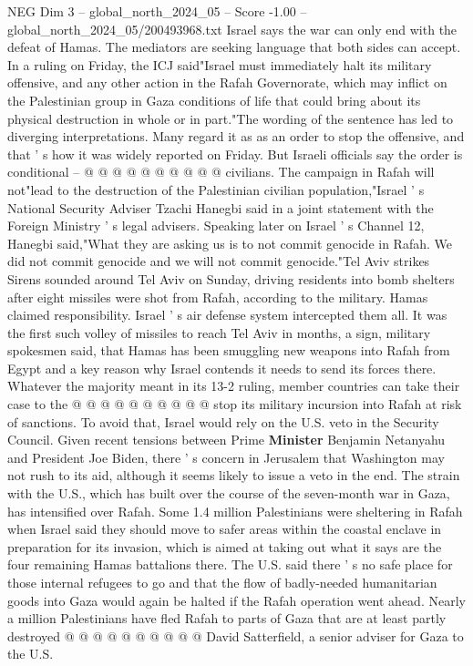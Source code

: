 \begin{textsample}{NEG Dim 3 – global\_north\_2024\_05 – Score -1.00 – global\_north\_2024\_05/200493968.txt}
Israel says the war can only end with the defeat of Hamas.
The mediators are seeking language that both sides can accept.
In a ruling on Friday, the ICJ said"Israel must immediately halt its military offensive, and any other action in the Rafah Governorate, which may inflict on the Palestinian group in Gaza conditions of life that could bring about its physical destruction in whole or in part."The wording of the sentence has led to diverging interpretations.
Many regard it as as an order to stop the offensive, and that ' s how it was widely reported on Friday.
But Israeli officials say the order is conditional -- @ @ @ @ @ @ @ @ @ @ civilians.
The campaign in Rafah will not"lead to the destruction of the Palestinian civilian population,"Israel ' s National Security Adviser Tzachi Hanegbi said in a joint statement with the Foreign Ministry ' s legal advisers.
Speaking later on Israel ' s Channel 12, Hanegbi said,"What they are asking us is to not commit genocide in Rafah.
We did not commit genocide and we will not commit genocide."Tel Aviv strikes Sirens sounded around Tel Aviv on Sunday, driving residents into bomb shelters after eight missiles were shot from Rafah, according to the military.
Hamas claimed responsibility.
Israel ' s air defense system intercepted them all.
It was the first such volley of missiles to reach Tel Aviv in months, a sign, military spokesmen said, that Hamas has been smuggling new weapons into Rafah from Egypt and a key reason why Israel contends it needs to send its forces there.
Whatever the majority meant in its 13-2 ruling, member countries can take their case to the @ @ @ @ @ @ @ @ @ @ stop its military incursion into Rafah at risk of sanctions.
To avoid that, Israel would rely on the U.S. veto in the Security Council.
Given recent tensions between Prime \textbf{Minister} Benjamin Netanyahu and President Joe Biden, there ' s concern in Jerusalem that Washington may not rush to its aid, although it seems likely to issue a veto in the end.
The strain with the U.S., which has built over the course of the seven-month war in Gaza, has intensified over Rafah.
Some 1.4 million Palestinians were sheltering in Rafah when Israel said they should move to safer areas within the coastal enclave in preparation for its invasion, which is aimed at taking out what it says are the four remaining Hamas battalions there.
The U.S. said there ' s no safe place for those internal refugees to go and that the flow of badly-needed humanitarian goods into Gaza would again be halted if the Rafah operation went ahead.
Nearly a million Palestinians have fled Rafah to parts of Gaza that are at least partly destroyed @ @ @ @ @ @ @ @ @ @ David Satterfield, a senior adviser for Gaza to the U.S.

\end{textsample}
